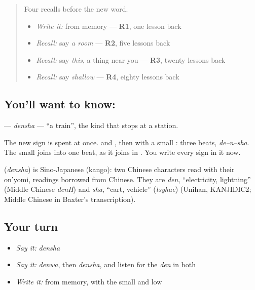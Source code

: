 \label{lesson:JA-C134-densha}



\begin{quote}
Four recalls before the new word.

\begin{itemize}
\raggedright
  \item \emph{Write it:} \textbf{} from memory — \textbf{R1}, one lesson back
  \item \emph{Recall:} say \emph{a room} — \textbf{R2}, five lessons back
  \item \emph{Recall:} say \emph{this}, a thing near you — \textbf{R3}, twenty lessons back
  \item \emph{Recall:} say \emph{shallow} — \textbf{R4}, eighty lessons back
\end{itemize}
\end{quote}

\subsection*{You'll want to know: }
\textbf{} — \emph{densha} — \textquotedblleft{}a train\textquotedblright{}, the kind that stops at a station.

The new sign is spent at once. \textbf{} and \textbf{}, then \textbf{} with a small \textbf{}: three beats, \emph{de–n–sha}. The small \textbf{} joins \textbf{} into one beat, as it joins \textbf{} in \textbf{}. You write every sign in it now.

\begin{cousinweb}
\textbf{} (\emph{densha}) is Sino-Japanese (kango): two Chinese characters read with their on'yomi, readings borrowed from Chinese. They are \emph{den}, \textquotedblleft{}electricity, lightning\textquotedblright{} (Middle Chinese \emph{denH}) and \emph{sha}, \textquotedblleft{}cart, vehicle\textquotedblright{} (\emph{tsyhae}) (Unihan, KANJIDIC2; Middle Chinese in Baxter's transcription).
\end{cousinweb}

\subsection*{Your turn}
\begin{itemize}
\raggedright
  \item \emph{Say it:} \emph{densha}
  \item \emph{Say it:} \emph{denwa}, then \emph{densha}, and listen for the \emph{den} in both
  \item \emph{Write it:} \textbf{} from memory, with the \textbf{} small and low
\end{itemize}

